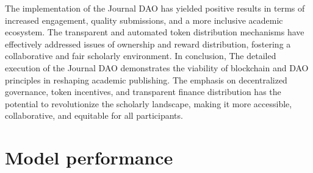 \documentclass[lettersize,journal]{IEEEtran}
\begin{document}
The implementation of the Journal DAO has yielded positive results in terms of increased engagement, quality submissions, and a more inclusive academic ecosystem. The transparent and automated token distribution mechanisms have effectively addressed issues of ownership and reward distribution, fostering a collaborative and fair scholarly environment.
In conclusion, The detailed execution of the Journal DAO demonstrates the viability of blockchain and DAO principles in reshaping academic publishing. The emphasis on decentralized governance, token incentives, and transparent finance distribution has the potential to revolutionize the scholarly landscape, making it more accessible, collaborative, and equitable for all participants.

\section{Model performance \label{sec:performance}}
\end{document}
